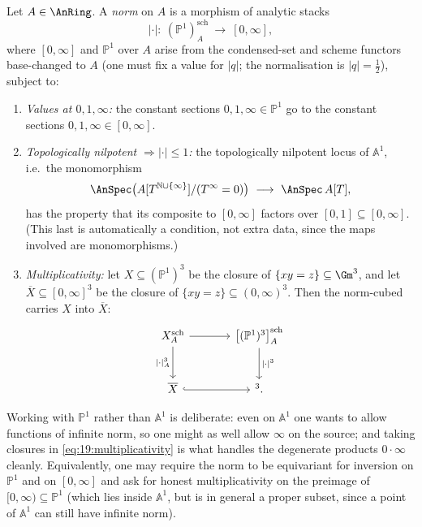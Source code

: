 \begin{definition}
\label{def:19:norm}
Let $A\in\AnRing$. A \emph{norm} on $A$ is a morphism of analytic stacks
\begin{equation*}
|\cdot|\colon\ (\mathbb P^1)^{\mathrm{sch}}_A\ \longrightarrow\ [0,\infty],
\end{equation*}
where $[0,\infty]$ and $\mathbb P^1$ over $A$ arise from the condensed-set and
scheme functors base-changed to $A$ (one must fix a value for $|q|$; the
normalisation is $|q|=\tfrac12$), subject to:
\begin{enumerate}
\item \emph{Values at $0,1,\infty$:} the constant sections $0,1,\infty\in\mathbb
P^1$ go to the constant sections $0,1,\infty\in[0,\infty]$.
\item \emph{Topologically nilpotent $\Rightarrow|\cdot|\le1$:} the topologically
nilpotent locus of $\mathbb A^1$, i.e.\ the monomorphism
\begin{equation*}
\AnSpec\bigl(A[T^{\mathbb N\cup\{\infty\}}]/(T^{\infty}=0)\bigr)\ \longrightarrow\ \AnSpec\,A[T],
\end{equation*}
has the property that its composite to $[0,\infty]$ factors over
$[0,1]\subseteq[0,\infty]$. (This last is automatically a condition, not extra
data, since the maps involved are monomorphisms.)
\item \emph{Multiplicativity:} let $X\subseteq(\mathbb P^1)^3$ be the closure of
$\{xy=z\}\subseteq\Gm^3$, and let $\overline X\subseteq[0,\infty]^3$ be the closure
of $\{xy=z\}\subseteq(0,\infty)^3$. Then the norm-cubed carries $X$ into
$\overline X$:
\begin{equation}
\label{eq:19:multiplicativity}
\begin{tikzcd}[row sep=large, column sep=large]
X^{\mathrm{sch}}_A\arrow[r]\arrow[d, "|\cdot|^3_A"'] & \bigl[(\mathbb P^1)^3\bigr]^{\mathrm{sch}}_A\arrow[d, "|\cdot|^3"] \\
\overline X\arrow[r, hook] & [0,\infty]^3 .
\end{tikzcd}
\end{equation}
\end{enumerate}
Working with $\mathbb P^1$ rather than $\mathbb A^1$ is deliberate: even on
$\mathbb A^1$ one wants to allow functions of infinite norm, so one might as well
allow $\infty$ on the source; and taking closures in
\eqref{eq:19:multiplicativity} is what handles the degenerate products $0\cdot\infty$
cleanly. Equivalently, one may require the norm to be equivariant for inversion on
$\mathbb P^1$ and on $[0,\infty]$ and ask for honest multiplicativity on the
preimage of $[0,\infty)\subseteq\mathbb P^1$ (which lies inside $\mathbb A^1$, but
is in general a proper subset, since a point of $\mathbb A^1$ can still have
infinite norm).
\end{definition}

